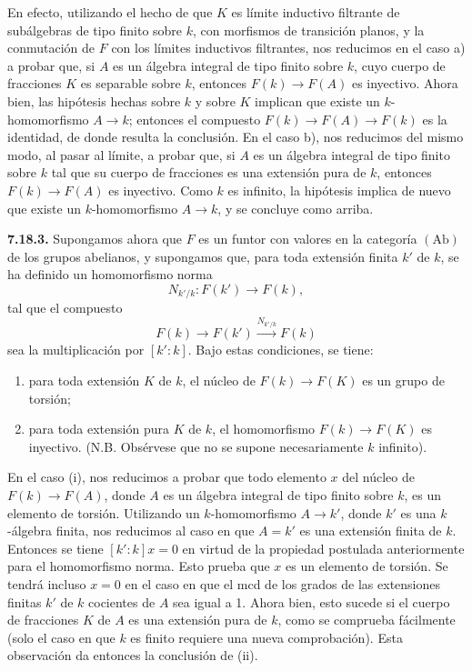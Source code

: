 En efecto, utilizando el hecho de que \(K\) es límite inductivo filtrante de subálgebras de tipo finito sobre \(k\), con morfismos de transición planos, y la conmutación de \(F\) con los límites inductivos filtrantes, nos reducimos en el caso a) a probar que, si \(A\) es un álgebra integral de tipo finito sobre \(k\), cuyo cuerpo de fracciones \(K\) es separable sobre \(k\), entonces \(F(k)\to F(A)\) es inyectivo. Ahora bien, las hipótesis hechas sobre \(k\) y sobre \(K\) implican que existe un \(k\)-homomorfismo \(A\to k\); entonces el compuesto \(F(k)\to F(A)\to F(k)\) es la identidad, de donde resulta la conclusión. En el caso b), nos reducimos del mismo modo, al pasar al límite, a probar que, si \(A\) es un álgebra integral de tipo finito sobre \(k\) tal que su cuerpo de fracciones es una extensión pura de \(k\), entonces \(F(k)\to F(A)\) es inyectivo. Como \(k\) es infinito, la hipótesis implica de nuevo que existe un \(k\)-homomorfismo \(A\to k\), y se concluye como arriba.

\textbf{7.18.3.} Supongamos ahora que \(F\) es un funtor con valores en la categoría \((\mathrm{Ab})\) de los grupos abelianos, y supongamos que, para toda extensión finita \(k'\) de \(k\), se ha definido un homomorfismo norma
\[
  N_{k'/k}:F(k')\longrightarrow F(k),
\]
tal que el compuesto
\[
  F(k)\longrightarrow F(k')\xrightarrow{N_{k'/k}}F(k)
\]
sea la multiplicación por \([k':k]\). Bajo estas condiciones, se tiene:
\begin{enumerate}[label=(\roman*)]
\item para toda extensión \(K\) de \(k\), el núcleo de \(F(k)\to F(K)\) es un grupo de torsión;
\item para toda extensión pura \(K\) de \(k\), el homomorfismo \(F(k)\to F(K)\) es inyectivo. (N.B. Obsérvese que no se supone necesariamente \(k\) infinito).
\end{enumerate}

En el caso (i), nos reducimos a probar que todo elemento \(x\) del núcleo de \(F(k)\to F(A)\), donde \(A\) es un álgebra integral de tipo finito sobre \(k\), es un elemento de torsión. Utilizando un \(k\)-homomorfismo \(A\to k'\), donde \(k'\) es una \(k\)-álgebra finita, nos reducimos al caso en que \(A=k'\) es una extensión finita de \(k\). Entonces se tiene \([k':k]x=0\) en virtud de la propiedad postulada anteriormente para el homomorfismo norma. Esto prueba que \(x\) es un elemento de torsión. Se tendrá incluso \(x=0\) en el caso en que el mcd de los grados de las extensiones finitas \(k'\) de \(k\) cocientes de \(A\) sea igual a 1. Ahora bien, esto sucede si el cuerpo de fracciones \(K\) de \(A\) es una extensión pura de \(k\), como se comprueba fácilmente (solo el caso en que \(k\) es finito requiere una nueva comprobación). Esta observación da entonces la conclusión de (ii).

